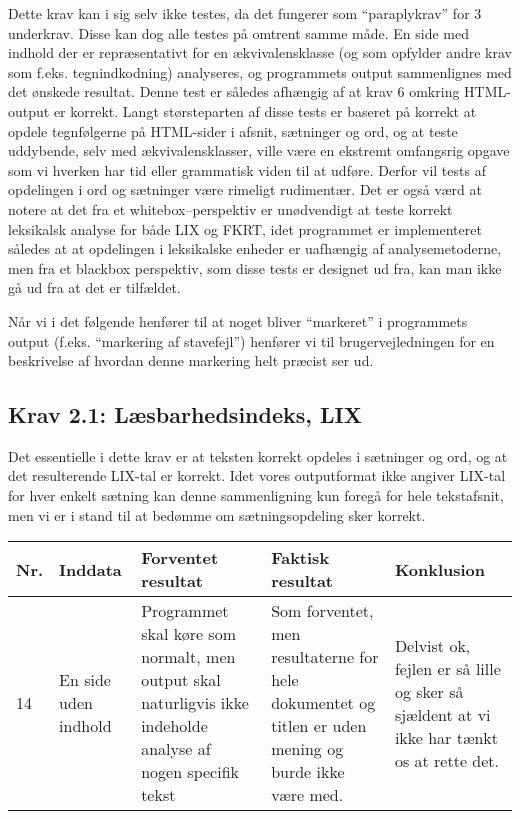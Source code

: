 \documentclass[a4paper,oneside,article]{memoir}
\begin{document}
\begin{landscape}
Dette krav kan i sig selv ikke testes, da det fungerer som
``paraplykrav'' for 3 underkrav. Disse kan dog alle testes på omtrent
samme måde. En side med indhold der er repræsentativt for en
ækvivalensklasse (og som opfylder andre krav som
f.eks. tegnindkodning) analyseres, og programmets output sammenlignes
med det ønskede resultat. Denne test er således afhængig af at krav 6
omkring HTML-output er korrekt. Langt størsteparten af disse tests er
baseret på korrekt at opdele tegnfølgerne på HTML-sider i afsnit,
sætninger og ord, og at teste uddybende, selv med ækvivalensklasser,
ville være en ekstremt omfangsrig opgave som vi hverken har tid eller
grammatisk viden til at udføre. Derfor vil tests af opdelingen i ord
og sætninger være rimeligt rudimentær. Det er også værd at notere at
det fra et whitebox--perspektiv er unødvendigt at teste korrekt
leksikalsk analyse for både LIX og FKRT, idet programmet er
implementeret således at at opdelingen i leksikalske enheder er
uafhængig af analysemetoderne, men fra et blackbox perspektiv, som
disse tests er designet ud fra, kan man ikke gå ud fra at det er
tilfældet.

Når vi i det følgende henfører til at noget bliver ``markeret'' i
programmets output (f.eks. ``markering af stavefejl'') henfører vi til
brugervejledningen for en beskrivelse af hvordan denne markering helt
præcist ser ud.

\subsection{Krav 2.1: Læsbarhedsindeks, LIX}

Det essentielle i dette krav er at teksten korrekt opdeles i sætninger
og ord, og at det resulterende LIX-tal er korrekt. Idet vores
outputformat ikke angiver LIX-tal for hver enkelt sætning kan denne
sammenligning kun foregå for hele tekstafsnit, men vi er i stand til
at bedømme om sætningsopdeling sker korrekt.

\begin{longtable}[c]{p{20pt}|p{220pt}|p{130pt}|p{130pt}|p{50pt}}
\textbf{Nr.} &
\textbf{Inddata} &
\textbf{Forventet resultat} &
\textbf{Faktisk resultat} &
\textbf{Konklusion} \\ \hline

14 &
En side uden indhold &
Programmet skal køre som normalt, men output skal naturligvis ikke
indeholde analyse af nogen specifik tekst &
Som forventet, men resultaterne for hele dokumentet og titlen er uden
mening og burde ikke være med. &
Delvist ok, fejlen er så lille og sker så sjældent at vi ikke har
tænkt os at rette det. \\ \hline


\end{longtable}
\end{landscape}
\end{document}
